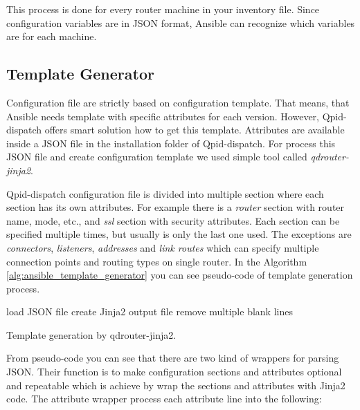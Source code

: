 This process is done for every router machine in your inventory file. Since configuration variables are in JSON format, Ansible can recognize which variables are for each machine.


\subsection{Template Generator}
Configuration file are strictly based on configuration template. That means, that Ansible needs template with specific attributes for each version. However, Qpid-dispatch offers smart solution how to get this template. Attributes are available inside a JSON file in the installation folder of Qpid-dispatch. For process this JSON file and create configuration template we used simple tool called \emph{qdrouter-jinja2}\footnotemark.

Qpid-dispatch configuration file is divided into multiple section where each section has its own attributes. For example there is a \emph{router} section with router name, mode, etc., and \emph{ssl} section with security attributes. Each section can be specified multiple times, but usually is only the last one used. The exceptions are \emph{connectors}, \emph{listeners}, \emph{addresses} and \emph{link routes} which can specify multiple connection points and routing types on single router. In the Algorithm \ref{alg:ansible_template_generator} you can see pseudo-code of template generation process.

\begin{center}
	\begin{algorithm}[H]
		 load JSON file\;
		 create Jinja2 output file\;
		 remove multiple blank lines\;
		 \caption{Template generation by qdrouter-jinja2.}
		 \label{alg:ansible_template_generator}
	\end{algorithm}
\end{center}

From pseudo-code you can see that there are two kind of wrappers for parsing JSON. Their function is to make configuration sections and attributes optional and repeatable which is achieve by wrap the sections and attributes with Jinja2 code. The attribute wrapper process each attribute line into the following:

